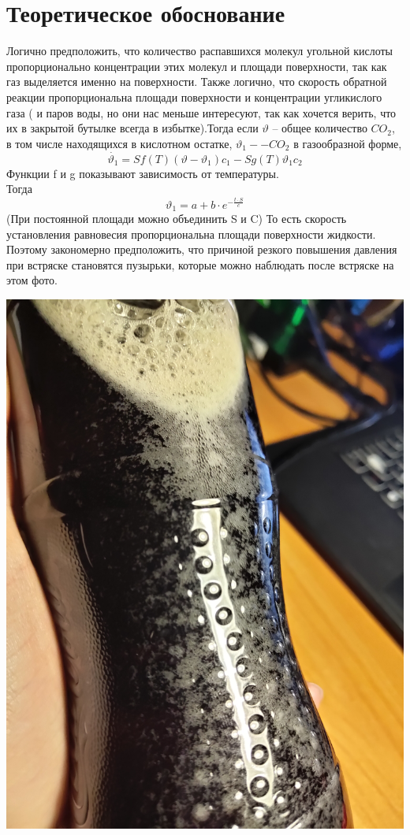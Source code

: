 \documentclass[12pt,a4paper]{scrartcl}
\begin{document}
\section{Теоретическое обоснование}
Логично предположить, что количество распавшихся молекул угольной кислоты пропорционально концентрации этих молекул и площади поверхности, так как газ выделяется именно на поверхности. Также логично, что скорость обратной реакции пропорциональна площади поверхности и концентрации угликислого газа ( и паров воды, но они нас меньше интересуют, так как хочется верить, что их в закрытой бутылке всегда в избытке).Тогда если $\vartheta$ -- общее количество $CO_2$, в том числе находящихся в кислотном остатке, $\vartheta_1 -- CO_2$  в газообразной форме,
\begin{displaymath}
\dot{\vartheta_1} = S f(T)(\vartheta - \vartheta_1)c_1 - S g(T) \vartheta_1  c_2
\end{displaymath}
Функции f и g показывают зависимость от температуры.\\
Тогда
\begin{displaymath}
\vartheta_1 = a + b\cdot e^{-\frac{t\cdot S}{c}}
\end{displaymath}
(При постоянной площади можно объединить S и C) То есть скорость установления равновесия пропорциональна площади поверхности жидкости. Поэтому закономерно предположить, что причиной  резкого повышения давления при встряске становятся пузырьки, которые можно наблюдать после встряске на этом фото.
\begin{flushleft}
\includegraphics[scale=0.07]{Bubbles}
\end{flushleft}
\end{document}
